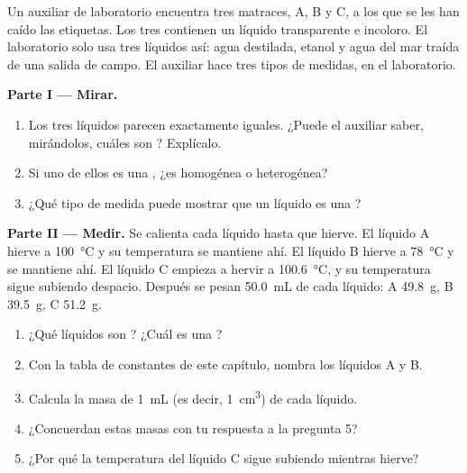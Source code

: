 \begin{problem}
\label{pb:g6:pure-substances-and-mixtures:1}
Un auxiliar de laboratorio encuentra tres matraces, A, B y C, a los que
se les han caído las etiquetas. Los tres contienen un líquido
transparente e incoloro. El laboratorio solo usa tres líquidos así:
agua destilada, etanol y agua del mar traída de una salida de campo. El
auxiliar hace tres tipos de medidas, en el laboratorio.

\medskip
\noindent\textbf{Parte I --- Mirar.}
\begin{enumerate}
  \item Los tres líquidos parecen exactamente iguales. ¿Puede el
        auxiliar saber, mirándolos, cuáles son ?
        Explícalo.
  \item Si uno de ellos es una , ¿es homogénea o heterogénea?
  \item ¿Qué tipo de medida puede mostrar que un líquido es una
        ?
\end{enumerate}

\medskip
\noindent\textbf{Parte II --- Medir.}
Se calienta cada líquido hasta que hierve. El líquido A hierve a
\qty{100}{\celsius} y su temperatura se mantiene ahí. El líquido B
hierve a \qty{78}{\celsius} y se mantiene ahí. El líquido C empieza a
hervir a \qty{100.6}{\celsius}, y su temperatura sigue subiendo
despacio. Después se pesan \qty{50.0}{mL} de cada líquido: A
\qty{49.8}{g}, B
\qty{39.5}{g}, C \qty{51.2}{g}.
\begin{enumerate}[resume]
  \item ¿Qué líquidos son ? ¿Cuál es una ?
  \item Con la tabla de constantes de este capítulo, nombra los
        líquidos A y B.
  \item Calcula la masa de \qty{1}{mL} (es decir, \qty{1}{cm^3}) de
        cada líquido.
  \item ¿Concuerdan estas masas con tu respuesta a la pregunta 5?
  \item ¿Por qué la temperatura del líquido C sigue subiendo mientras
        hierve?
\end{enumerate}


\end{problem}
